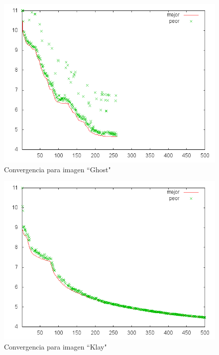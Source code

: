 \begin{figure}[b]
    \includegraphics[width=1.0\textwidth]{plot_ghost}
    \caption{Convergencia para imagen ``Ghost"}
    \label{img:plot-ghost}
\end{figure}

\begin{figure}[b]
    \includegraphics[width=1.0\textwidth]{plot_klay}
    \caption{Convergencia para imagen ``Klay"}
    \label{img:plot-klay}
\end{figure}


